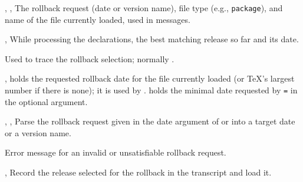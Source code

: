 \documentclass{l3in2edoc}
\begin{document}
\begin{function}[int]
  {
    \pkgcls@arg,
    \pkgcls@ext,
    \pkgcls@name
  }
  The rollback request (date or version name), file type (e.g.,
  \texttt{package}), and name of the file currently loaded, used
  in messages.
\end{function}



\begin{function}[int]
  {
    \pkgcls@candidate,
    \pkgcls@releasedate
  }
  While processing the  declarations, the best
  matching release so far and its date.
\end{function}



\begin{function}[int]
  {
    \pkgcls@debug
  }
  Used to trace the rollback selection; normally .
\end{function}



\begin{function}[int]
  {
    \pkgcls@innerdate,
    \pkgcls@mindate
  }
   holds the requested rollback date for the file
  currently loaded (or \TeX's largest number if there is none); it is
  used by .  holds the minimal
  date requested by \texttt{=} in the optional argument.
\end{function}



\begin{function}[int]
  {
    \pkgcls@parse@date@arg,
    \pkgcls@parse@date@arg@,
    \pkgcls@parse@date@arg@version
  }
  Parse the rollback request given in the date argument of
   or  into a target date or a
  version name.
\end{function}



\begin{function}[int]
  {
    \pkgcls@rollbackdate@error
  }
  Error message for an invalid or unsatisfiable rollback request.
\end{function}



\begin{function}[int]
  {
    \pkgcls@show@selection,
    \pkgcls@use@this@release
  }
  Record the release selected for the rollback in the transcript and
  load it.
\end{function}
\end{document}
